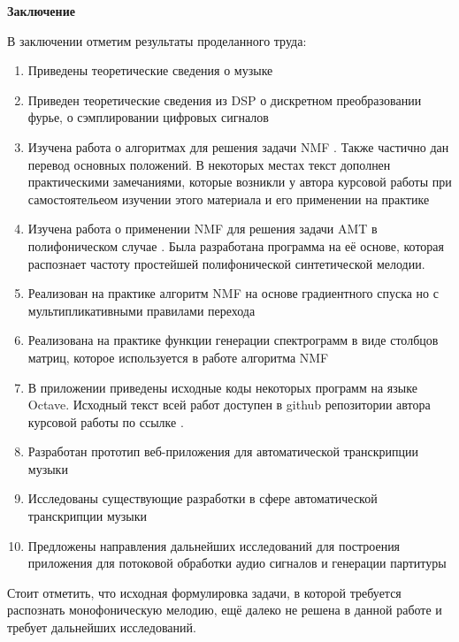 \documentclass[oneside, final, 12pt]{extarticle}
\begin{document}
{\large \bf Заключение \\}
  В заключении отметим результаты проделанного труда:
  \begin{enumerate}
    \item Приведены теоретические сведения о музыке
    \item Приведен теоретические сведения из DSP о дискретном
      преобразовании фурье, о сэмплировании цифровых сигналов
    \item Изучена работа о алгоритмах для решения задачи NMF \cite{DDL}.
      Также частично дан перевод основных положений. В некоторых
      местах текст дополнен практическими замечаниями, которые
      возникли у автора курсовой работы при самостоятельеом изучении
      этого материала и его применении на практике
    \item Изучена работа о применении NMF для решения задачи AMT
      в полифоническом случае \cite{PMTPS}. Была разработана
      программа на её основе, которая распознает частоту
      простейшей полифонической синтетической мелодии.
    \item Реализован на практике алгоритм NMF на основе градиентного
      спуска но с мультипликативными правилами перехода
    \item Реализована на практике функции генерации спектрограмм
      в виде столбцов матриц, которое используется в работе алгоритма
      NMF
    \item В приложении приведены исходные коды некоторых программ
      на языке Octave. Исходный текст всей работ доступен в github
      репозитории автора курсовой работы по ссылке \cite{L:course-paper}.
    \item Разработан прототип веб-приложения для автоматической
      транскрипции музыки
    \item Исследованы существующие разработки в сфере автоматической
      транскрипции музыки
    \item Предложены направления дальнейших исследований для построения
      приложения для потоковой обработки аудио сигналов и генерации
      партитуры
  \end{enumerate}

  Стоит отметить, что исходная формулировка задачи, в которой требуется
  распознать монофоническую мелодию, ещё далеко не решена в данной работе
  и требует дальнейших исследований.

\cleardoublepage
\end{document}
